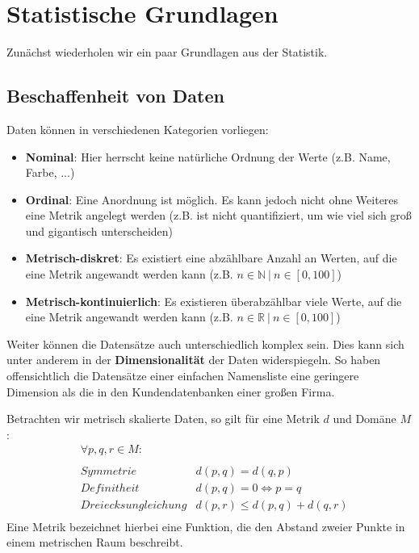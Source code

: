 \section{Statistische Grundlagen}
Zunächst wiederholen wir ein paar Grundlagen aus der Statistik.

\subsection{Beschaffenheit von Daten}
Daten können in verschiedenen Kategorien vorliegen:
\begin{itemize}
	\item \textbf{Nominal}: Hier herrscht keine natürliche Ordnung der
            Werte (z.B. Name, Farbe, ...)
	\item \textbf{Ordinal}: Eine Anordnung ist möglich. Es kann jedoch
            nicht ohne Weiteres eine Metrik angelegt werden (z.B.  ist nicht
            quantifiziert, um wie viel sich groß und gigantisch unterscheiden)
	\item \textbf{Metrisch-diskret}: Es existiert eine abzählbare Anzahl an
            Werten, auf die eine Metrik angewandt werden kann (z.B.
            \({n\in \mathbb{N}\ |\ n \in [0,100]}\))
	\item \textbf{Metrisch-kontinuierlich}: Es existieren überabzählbar viele
            Werte, auf die eine Metrik angewandt werden kann (z.B.
            \({n\in \mathbb{R}\ |\ n \in [0,100]}\))
\end{itemize}
Weiter können die Datensätze auch unterschiedlich komplex sein. Dies kann sich
unter anderem in der \textbf{Dimensionalität} der Daten widerspiegeln. So haben
offensichtlich die Datensätze einer einfachen Namensliste eine geringere
Dimension als die  in den Kundendatenbanken einer großen Firma.

Betrachten wir metrisch skalierte Daten, so gilt für eine Metrik \(d\) und
Domäne \(M\):
\begin{align*}
	&\forall p,q,r \in M:&\\
	\\
	&Symmetrie &d(p,q)=d(q,p)\\
	&Definitheit &d(p,q)=0\Leftrightarrow p = q\\
	&Dreiecksungleichung &d(p,r)\leq d(p,q)+d(q,r)\\
\end{align*}
Eine Metrik bezeichnet hierbei eine Funktion, die den Abstand zweier Punkte in
einem metrischen Raum beschreibt.

